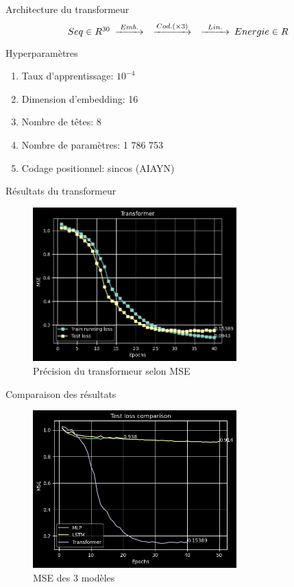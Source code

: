\documentclass{beamer}
\begin{document}
\begin{frame}{Architecture du transformeur}
\begin{equation*}
    \begin{CD}
        @. Seq \in R^{30}
        @>Emb.>> 
        @>Cod. (\times 3)>> 
        @>Lin.>> Energie \in R
    \end{CD}
\end{equation*}

\begin{block}{Hyperparamètres}
\begin{enumerate}
    \item Taux d'apprentissage: $10^{-4}$
    \item Dimension d'embedding: 16
    \item Nombre de têtes: 8
    \item Nombre de paramètres: 1 786 753 
    \item Codage positionnel: sincos (AIAYN)
\end{enumerate}
\end{block}
\end{frame}


\begin{frame}{Résultats du transformeur}
\begin{figure} \label{fig:transformer_accuracy}
    \caption{Précision du transformeur selon MSE} \center
    \includegraphics[width=0.7\textwidth]{images/2023-04-02-13-48-49.png}
\end{figure}
\end{frame}
\begin{frame}{Comparaison des résultats}
\begin{figure}
    \caption{MSE des 3 modèles} \center
    \includegraphics[width=0.7\textwidth]{images/comparaison.png}
\end{figure}
\end{frame}
\end{document}
